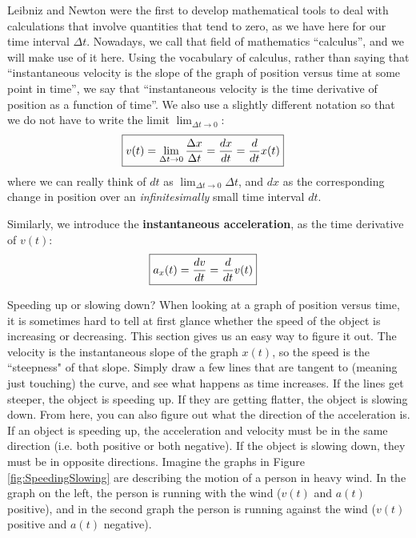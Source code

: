 Leibniz and Newton were the first to develop mathematical tools to deal with calculations that involve quantities that tend to zero, as we have here for our time interval $\Delta t$. Nowadays, we call that field of mathematics ``calculus'', and we will make use of it here. Using the vocabulary of calculus, rather than saying that ``instantaneous velocity is the slope of the graph of position versus time at some point in time'', we say that ``instantaneous velocity is the time derivative of position as a function of time''. We also use a slightly different notation so that we do not have to write the limit $\lim_{\Delta t\to 0}$:
\begin{align}
\label{eqn:DescribingMotionIn1D:vdef}
\Aboxed{v(t)=\lim_{\Delta t\to 0} \frac{\Delta x}{\Delta t}=\frac{dx}{dt}=\frac{d}{dt} x(t)}
\end{align}
where we can really think of $dt$ as $\lim_{\Delta t\to 0}\Delta t$, and $dx$ as the corresponding change in position over an \textit{infinitesimally} small time interval $dt$.

Similarly, we introduce the \textbf{instantaneous acceleration}, as the time derivative of $v(t)$:
\begin{align}
\Aboxed{a_x(t)=\frac{dv}{dt}=\frac{d}{dt}v(t)}
\end{align}

\begin{studentopinionOW}{Speeding up or slowing down?}
When looking at a graph of position versus time, it is sometimes hard to tell at first glance whether the speed of the object is increasing or decreasing. This section gives us an easy way to figure it out. The velocity is the instantaneous slope of the graph $x(t)$, so the speed is the ``steepness" of that slope. Simply draw a few lines that are tangent to (meaning just touching) the curve, and see what happens as time increases. If the lines get steeper, the object is speeding up. If they are getting flatter, the object is slowing down.
From here, you can also figure out what the direction of the acceleration is. If an object is speeding up, the acceleration and velocity must be in the same direction (i.e. both positive or both negative). If the object is slowing down, they must be in opposite directions. Imagine the graphs in Figure \ref{fig:SpeedingSlowing} are describing the motion of a person in heavy wind. In the graph on the left, the person is running with the wind ($v(t)$ and $a(t)$ positive), and in the second graph the person is running against the wind ($v(t)$ positive and $a(t)$ negative). 
\end{studentopinionOW} 



